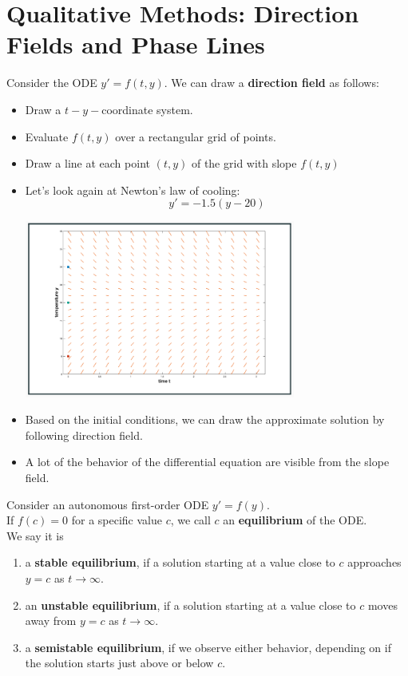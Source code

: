 \documentclass[a4paper, 10pt]{article}
\numberwithin{equation}{section}
\begin{document}
\section{Qualitative Methods: Direction Fields and Phase Lines}
\begin{definition}
    Consider the ODE $y'=f(t,y)$. We can draw a \textbf{direction field} as follows:
    \begin{itemize}
        \item Draw a $t-y-$coordinate system.
        \item Evaluate $f(t,y)$ over a rectangular grid of points.
        \item Draw a line at each point $(t,y)$ of the grid with slope $f(t,y)$
    \end{itemize}
\end{definition}
\begin{itemize}
    \item Let's look again at Newton's law of cooling:
    \begin{equation}
        y'=-1.5(y-20)
    \end{equation}
    \begin{center}
        \includegraphics[width=0.7\textwidth]{mat292/fig1.png}
    \end{center}
    \item Based on the initial conditions, we can draw the approximate solution by following direction field.
    \item A lot of the behavior of the differential equation are visible from the slope field. 
\end{itemize}
\begin{definition}
    Consider an autonomous first-order ODE $y'=f(y)$.\\If $f(c)=0$ for a specific value $c$, we call $c$ an \textbf{equilibrium} of the ODE.\\We say it is
    \begin{enumerate}
        \item a \textbf{stable equilibrium}, if a solution starting at a value close to $c$ approaches $y=c$ as $t\to\infty$.
        \item an \textbf{unstable equilibrium}, if a solution starting at a value close to $c$ moves away from $y=c$ as $t\to\infty$.
        \item a \textbf{semistable equilibrium}, if we observe either behavior, depending on if the solution starts just above or below $c$.
    \end{enumerate}
\end{definition}
\end{document}
